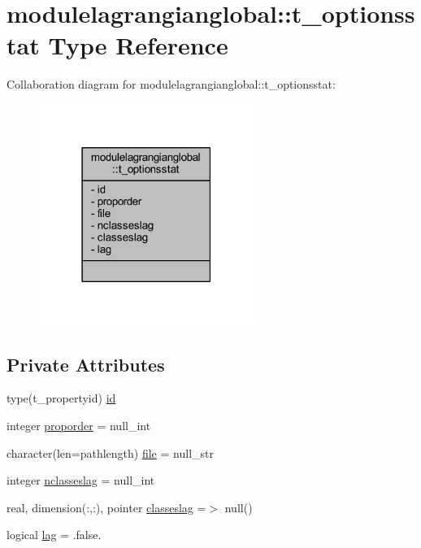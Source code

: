 \hypertarget{structmodulelagrangianglobal_1_1t__optionsstat}{}\section{modulelagrangianglobal\+:\+:t\+\_\+optionsstat Type Reference}
\label{structmodulelagrangianglobal_1_1t__optionsstat}


Collaboration diagram for modulelagrangianglobal\+:\+:t\+\_\+optionsstat\+:\nopagebreak
\begin{figure}[H]
\begin{center}
\leavevmode
\includegraphics[width=198pt]{structmodulelagrangianglobal_1_1t__optionsstat__coll__graph}
\end{center}
\end{figure}
\subsection*{Private Attributes}
\begin{DoxyCompactItemize}
\item 
type(t\+\_\+propertyid) \mbox{\hyperlink{structmodulelagrangianglobal_1_1t__optionsstat_a22040dc8b248a4f44b514bc04aed04f5}{id}}
\item 
integer \mbox{\hyperlink{structmodulelagrangianglobal_1_1t__optionsstat_a7581130ff63403b68b343e3e82711069}{proporder}} = null\+\_\+int
\item 
character(len=pathlength) \mbox{\hyperlink{structmodulelagrangianglobal_1_1t__optionsstat_af2c1b3bea2de24c1d769cf2c368674a0}{file}} = null\+\_\+str
\item 
integer \mbox{\hyperlink{structmodulelagrangianglobal_1_1t__optionsstat_a8d844db7312a3963c460cd371a4d0b84}{nclasseslag}} = null\+\_\+int
\item 
real, dimension(\+:,\+:), pointer \mbox{\hyperlink{structmodulelagrangianglobal_1_1t__optionsstat_a71c4508784133b1b4edc2b72de9ee7b2}{classeslag}} =$>$ null()
\item 
logical \mbox{\hyperlink{structmodulelagrangianglobal_1_1t__optionsstat_a0b1a6a5ff22457efbe351d3f399370a0}{lag}} = .false.
\end{DoxyCompactItemize}


